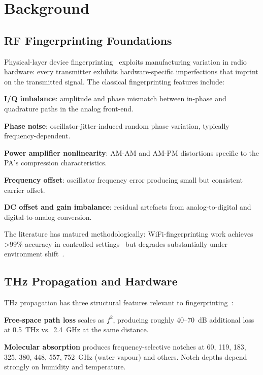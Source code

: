 \documentclass[sigconf,nonacm]{acmart}
\begin{document}
\section{Background}

\subsection{RF Fingerprinting Foundations}

Physical-layer device fingerprinting~\cite{brik2008paradis,
xu2024rffingersurv} exploits manufacturing variation in radio
hardware: every transmitter exhibits hardware-specific imperfections
that imprint on the transmitted signal. The classical
fingerprinting features include:

\textbf{I/Q imbalance}: amplitude and phase mismatch between
in-phase and quadrature paths in the analog front-end.

\textbf{Phase noise}: oscillator-jitter-induced random phase
variation, typically frequency-dependent.

\textbf{Power amplifier nonlinearity}: AM-AM and AM-PM distortions
specific to the PA's compression characteristics.

\textbf{Frequency offset}: oscillator frequency error producing
small but consistent carrier offset.

\textbf{DC offset and gain imbalance}: residual artefacts from
analog-to-digital and digital-to-analog conversion.

The literature has matured methodologically: WiFi-fingerprinting
work achieves >99\% accuracy in controlled settings~\cite{merchant2018deep,
sankhe2019oracle} but degrades substantially under
environment shift~\cite{xie2021unsupervisedrff,al2024crossenv}.

\subsection{THz Propagation and Hardware}

THz propagation has three structural features relevant to
fingerprinting~\cite{akyildiz2022terahertz,slocum2015thzabsorption}:

\textbf{Free-space path loss} scales as $f^2$, producing roughly
40--70~dB additional loss at 0.5~THz vs.\ 2.4~GHz at the same
distance.

\textbf{Molecular absorption} produces frequency-selective notches
at 60, 119, 183, 325, 380, 448, 557, 752~GHz (water vapour) and
others. Notch depths depend strongly on humidity and temperature.
\end{document}
